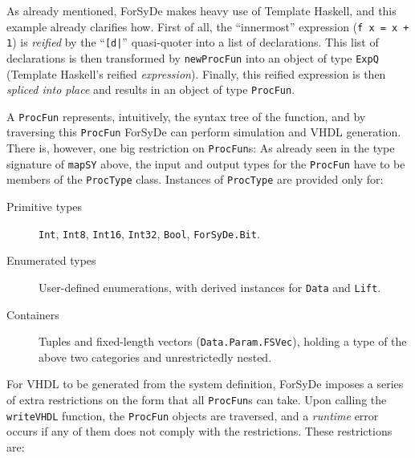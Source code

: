 
            As already mentioned, ForSyDe makes heavy use of Template Haskell, and this example
            already clarifies how. First of all, the ``innermost'' expression (\verb;f x = x + 1;)
            is \emph{reified} by the ``\texttt{[d|}'' quasi-quoter into a list of declarations. This
            list of declarations is then transformed by \texttt{newProcFun} into an object of type
            \texttt{ExpQ} (Template Haskell's reified \emph{expression}). Finally, this reified
            expression is then \emph{spliced into place} and results in an object of type
            \texttt{ProcFun}.

            A \texttt{ProcFun} represents, intuitively, the syntax tree of the function, and by
            traversing this \texttt{ProcFun} ForSyDe can perform simulation and VHDL generation.
            There is, however, one big restriction on \texttt{ProcFun}s: As already seen in the type
            signature of \texttt{mapSY} above, the input and output types for the \texttt{ProcFun}
            have to be members of the \texttt{ProcType} class. Instances of \texttt{ProcType} are
            provided only for:

            \begin{description}
                \item[Primitive types] \texttt{Int}, \texttt{Int8}, \texttt{Int16},
                    \texttt{Int32}, \texttt{Bool}, \texttt{ForSyDe.Bit}.

                \item[Enumerated types] User-defined enumerations, with derived instances for
                    \texttt{Data} and \texttt{Lift}.

                \item[Containers] Tuples and fixed-length vectors (\texttt{Data.Param.FSVec}),
                    holding a type of the above two categories and unrestrictedly nested.
            \end{description}

            For VHDL to be generated from the system definition, ForSyDe imposes a series of extra
            restrictions on the form that all \texttt{ProcFun}s can take. Upon calling the
            \texttt{writeVHDL} function, the \texttt{ProcFun} objects are traversed, and a
            \emph{runtime} error occurs if any of them does not comply with the restrictions. These
            restrictions are:

